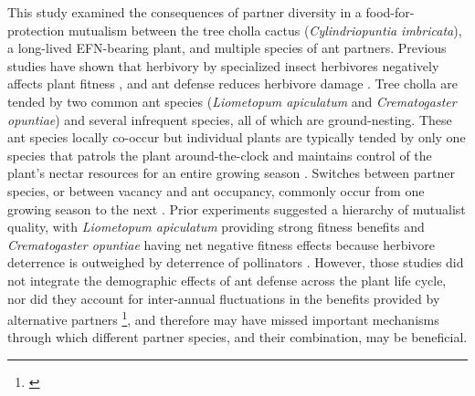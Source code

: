 \documentclass[11pt]{article}
\newcommand{\tom}[2]{{\color{red}{#1}}\footnote{\textit{\color{red}{#2}}}}
\begin{document}
This study examined the consequences of partner diversity in a food-for-protection mutualism between the tree cholla cactus (\textit{Cylindriopuntia imbricata}), a long-lived EFN-bearing plant, and multiple species of ant partners.
Previous studies have shown that herbivory by specialized insect herbivores negatively affects plant fitness \cite{Miller2009}, and ant defense reduces herbivore damage \cite{Miller2007}. 
Tree cholla are tended by two common ant species (\textit{Liometopum apiculatum} and \textit{Crematogaster opuntiae}) and several infrequent species, all of which are ground-nesting. 
These ant species locally co-occur but individual plants are typically tended by only one species that patrols the plant around-the-clock and maintains control of the plant's nectar resources for an entire growing season \citep{Ohm2014,donald2022}. 
Switches between partner species, or between vacancy and ant occupancy, commonly occur from one growing season to the next \citep{Miller2007}. 
Prior experiments suggested a hierarchy of mutualist quality, with \textit{Liometopum apiculatum} providing strong fitness benefits and \textit{Crematogaster opuntiae} having net negative fitness effects because herbivore deterrence is outweighed by deterrence of pollinators \citep{Miller2007,Ohm2014}. 
However, those studies did not integrate the demographic effects of ant defense across the plant life cycle, nor did they account for inter-annual fluctuations in the benefits provided by alternative partners \tom{(which may arise from fluctuations in herbivore pressure or identity)}{This is awkwardly inserted here but I think we need to explain that the reason the portfolio effect may arise is the threat to plants can vary from year to year}, and therefore may have missed important mechanisms through which different partner species, and their combination, may be beneficial. 
	
\end{document}
